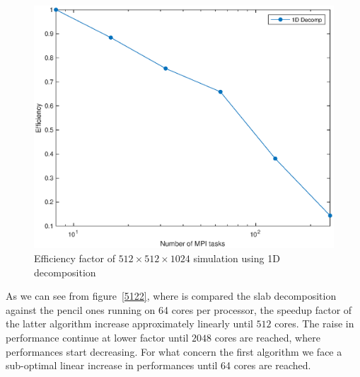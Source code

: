 \begin{figure}
\begin{center}
\includegraphics[scale=0.55]{grafici/5123}
\caption{Efficiency factor of $512\times 512\times 1024$ simulation using 1D decomposition}
\label{5123}
\end{center}
\end{figure}

As we can see from figure~\ref{5122}, where is compared the slab decomposition against the pencil ones running on 64 cores per processor, the speedup factor of the latter algorithm increase approximately linearly until $512$ cores. The raise in performance continue at lower factor until $2048$ cores are reached, where performances start decreasing. For what concern the first algorithm we face a sub-optimal linear increase in performances until 64 cores are reached. 

